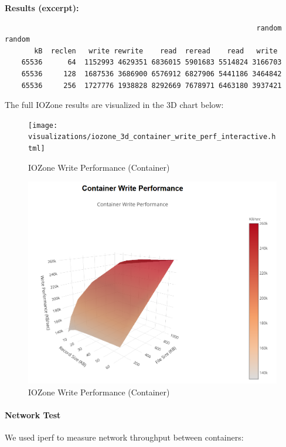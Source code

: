 \textbf{Results (excerpt):}

\begin{verbatim}
                                                            random    random
       kB  reclen   write rewrite    read  reread    read   write
    65536      64  1152993 4629351 6836015 5901683 5514824 3166703
    65536     128  1687536 3686900 6576912 6827906 5441186 3464842
    65536     256  1727776 1938828 8292669 7678971 6463180 3937421
\end{verbatim}

The full IOZone results are visualized in the 3D chart below:

\begin{figure}
\centering
\texttt{[image: visualizations/iozone\_3d\_container\_write\_perf\_interactive.html]}
\caption{IOZone Write Performance (Container)}
\end{figure}

\begin{figure}
\centering
\includegraphics{visualizations/IOZONE-CONTAINER.png}
\caption{IOZone Write Performance (Container)}
\end{figure}

\hypertarget{network-test-1}{%
\paragraph{Network Test}\label{network-test-1}}

We used iperf to measure network throughput between containers:

